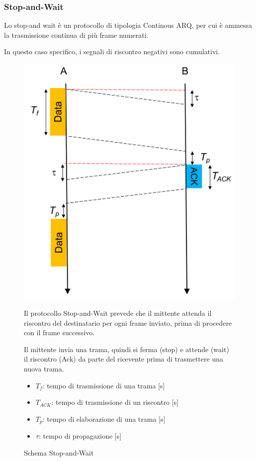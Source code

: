 \newpage
\subsubsection{Stop-and-Wait}
Lo stop-and wait è un protocollo di tipologia Continous ARQ, per cui è ammessa la trasmissione continua di più frame numerati.

In questo caso specifico, i segnali di riscontro negativi sono cumulativi.

\begin{figure}[htbp]
    \centering
    \begin{minipage}{0.4\textwidth}
        \includegraphics[width=\linewidth]{images/stopwait.png}
        \caption{Schema Stop-and-Wait}
    \end{minipage}%
    \hfill
    \begin{minipage}{0.55\textwidth}
        Il protocollo Stop-and-Wait prevede che il mittente attenda il riscontro del destinatario per ogni frame inviato, prima di procedere con il frame successivo.

        Il mittente invia una trama, quindi si ferma (stop) e attende (wait) il riscontro (Ack) da parte del ricevente prima di trasmettere una nuova trama.
\begin{itemize}
    \item $T_f$: tempo di trasmissione di una trama [s]
    \item $T_{ACK}$: tempo di trasmissione di un riscontro [s]
    \item $T_p$: tempo di elaborazione di una trama [s]
    \item $\tau$: tempo di propagazione [s]
\end{itemize}
    \end{minipage}
\end{figure}

